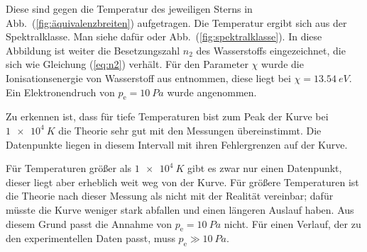 Diese sind gegen die Temperatur des jeweiligen Sterns in Abb.\ (\ref{fig:äquivalenzbreiten}) aufgetragen.
Die Temperatur ergibt sich aus der Spektralklasse.
Man siehe dafür \cite{anleitung464} oder Abb.\ (\ref{fig:spektralklasse}).
In diese Abbildung ist weiter die Besetzungszahl $n_2$ des Wasserstoffs eingezeichnet, die sich wie Gleichung (\ref{eq:n2}) verhält.
Für den Parameter $\chi $ wurde die Ionisationsenergie von Wasserstoff aus \cite{saha} entnommen, diese liegt bei $\chi =\SI{13.54}{eV}$.
Ein Elektronendruch von $p_\text{e}=\SI{10}{Pa}$ wurde angenommen.

Zu erkennen ist, dass für tiefe Temperaturen bist zum Peak der Kurve bei $\SI{1e+4}{K}$ die Theorie sehr gut mit den Messungen übereinstimmt.
Die Datenpunkte liegen in diesem Intervall mit ihren Fehlergrenzen auf der Kurve.

Für Temperaturen größer als $\SI{1e+4}{K}$ gibt es zwar nur einen Datenpunkt, dieser liegt aber erheblich weit weg von der Kurve.
Für größere Temperaturen ist die Theorie nach dieser Messung als nicht mit der Realität vereinbar; dafür müsste die Kurve weniger stark abfallen und einen längeren Auslauf haben.
Aus diesem Grund passt die Annahme von $p_\text{e}=\SI{10}{Pa}$ nicht.
Für einen Verlauf, der zu den experimentellen Daten passt, muss $p_\text{e}\gg \SI{10}{Pa}$. %
